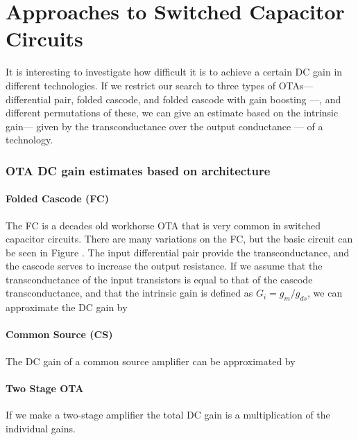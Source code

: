 
\section{Approaches to Switched Capacitor Circuits}


It is interesting to investigate how difficult it is to achieve a
certain DC gain in different technologies. If we restrict our search to
three types of OTAs--- differential pair, folded cascode, and folded
cascode with gain boosting ---, and different permutations of these, we can give an estimate based on the
intrinsic gain--- given by the transconductance over the output conductance
--- of a technology. 

\subsubsection{OTA DC gain estimates based on architecture}

\paragraph{Folded Cascode (FC)}
The FC is a decades old workhorse OTA that is very common in switched
capacitor circuits. There are many variations on the FC, but the basic circuit
can be seen in Figure \label{fig:foldedcasc}. The input differential
pair provide the transconductance, and the cascode serves to increase the
output resistance. If we assume that the transconductance of the input
transistors is equal to that of the cascode transconductance, and that
the intrinsic gain is defined as $G_i = g_m/g_{ds}$, we can
approximate the DC gain by

\paragraph{Common Source (CS)}
The DC gain of a common source amplifier can be approximated by

\paragraph{Two Stage OTA}
If we make a two-stage amplifier the total DC gain is a multiplication of
the individual gains.

